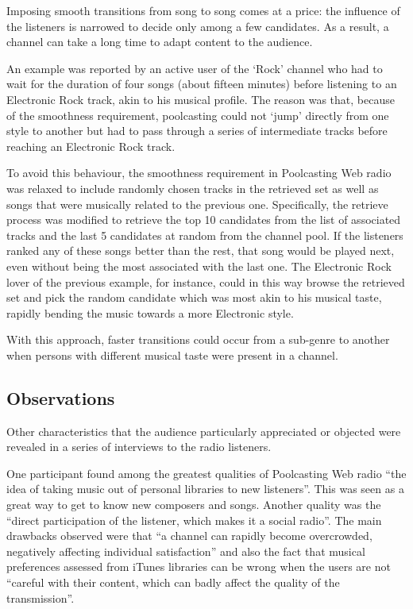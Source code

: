 Imposing smooth transitions from song to song comes at a price: the influence of the listeners is narrowed to decide only among a few candidates. As a result, a channel can take a long time to adapt content to the audience.

An example was reported by an active user of the `Rock' channel who had to wait for the duration of four songs (about fifteen minutes) before listening to an Electronic Rock track, akin to his musical profile.
The reason was that, because of the smoothness requirement, poolcasting could not `jump' directly from one style to another but had to pass through a series of intermediate tracks before reaching an Electronic Rock track.

To avoid this behaviour, the smoothness requirement in Poolcasting Web radio was relaxed to include randomly chosen tracks in the retrieved set as well as songs that were musically related to the previous one.
Specifically, the retrieve process was modified to retrieve the top 10 candidates from the list of associated tracks and the last 5 candidates at random from the channel pool.
If the listeners ranked any of these songs better than the rest, that song would be played next, even without being the most associated with the last one.
%
The Electronic Rock lover of the previous example, for instance, could in this way browse the retrieved set and pick the random candidate which was most akin to his musical taste, rapidly bending the music towards a more Electronic style.

With this approach, faster transitions could occur from a sub-genre to another when persons with different musical taste were present in a channel.


\subsection{Observations} %
\label{sub:subjective_evaluation}

Other characteristics that the audience particularly appreciated or objected were revealed in a series of interviews to the radio listeners.

One participant found among the greatest qualities of Poolcasting Web radio ``the idea of taking music out of personal libraries to new listeners''. This was seen as a great way to get to know new composers and songs. Another quality was the ``direct participation of the listener, which makes it a social radio''.
The main drawbacks observed were that ``a channel can rapidly become overcrowded, negatively affecting individual satisfaction'' and also the fact that musical preferences assessed from iTunes libraries can be wrong when the users are not ``careful with their content, which can badly affect the quality of the transmission''.

